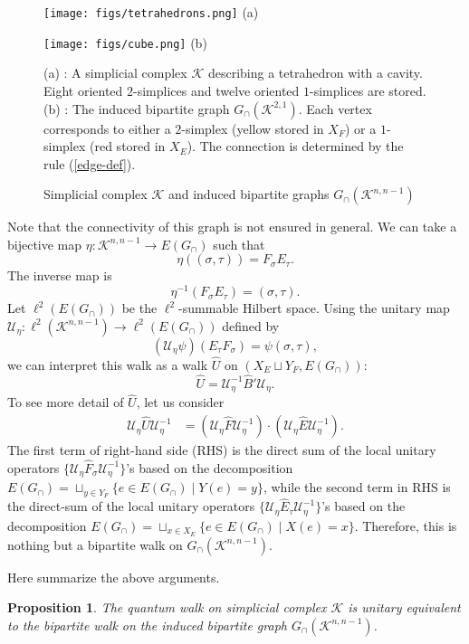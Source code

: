 \documentclass[a4paper,12pt]{article}
\newtheorem{proposition}[definition]{Proposition}
\numberwithin{equation}{section}
\begin{document}
\begin{figure}[htbp]\em
\begin{minipage}{0.5\hsize}
\centering
\texttt{[image: figs/tetrahedrons.png]}
(a)
\end{minipage}
\begin{minipage}{0.5\hsize}
\centering
\texttt{[image: figs/cube.png]}
(b)
\end{minipage}
\caption{Simplicial complex $\mathcal{K}$ and induced bipartite graphs $G_\cap (\mathcal{K}^{n,n-1})$}
\label{fig-bipartite}
(a) : A simplicial complex $\mathcal{K}$ describing a tetrahedron with a cavity. 
Eight oriented $2$-simplices and twelve oriented $1$-simplices are stored.
(b) : The induced bipartite graph $G_\cap (\mathcal{K}^{2,1})$.
Each vertex corresponds to either a $2$-simplex (yellow stored in $X_F$) or a $1$-simplex (red stored in $X_E$).
The connection is determined by the rule (\ref{edge-def}).
\end{figure}


Note that the connectivity of this graph is not ensured in general.
We can take a bijective map $\eta:\mathcal{K}^{n,n-1}\to E(G_\cap)$ such that
	\[ \eta((\sigma,\tau))=F_\sigma E_\tau.  \]
The inverse map is 
	\[ \eta^{-1}(F_{\sigma}E_{\tau})=(\sigma,\tau). \]
Let $\ell^2(E(G_\cap))$ be the $\ell^2$-summable Hilbert space. 
Using the unitary map $\mathcal{U}_\eta: \ell^2(\mathcal{K}^{n,n-1})\to \ell^2(E(G_\cap))$ defined by
\begin{equation*}
(\mathcal{U}_\eta\psi)(E_{\tau}F_{\sigma})= \psi(\sigma,\tau),
\end{equation*}
we can interpret this walk as a walk $\hat{U}$ on $(X_E\sqcup Y_F, E(G_\cap))$: 
\begin{equation*}
\hat{U}=\mathcal{U}_{\eta}^{-1} \hat{B}' \mathcal{U}_\eta.
\end{equation*}
To see more detail of $\hat{U}$, let us consider   
	\begin{align*} 
        \mathcal{U}_\eta \hat{U} \mathcal{U}_\eta^{-1}
        	&=  (\mathcal{U}_\eta \hat{F} \mathcal{U}_\eta^{-1})\cdot (\mathcal{U}_\eta \hat{E} \mathcal{U}_\eta^{-1}).
        \end{align*}
The first term of right-hand side (RHS) is the direct sum of the local unitary operators $\{\mathcal{U}_\eta\hat{F}_\sigma\mathcal{U}_{\eta}^{-1}\}$'s based on the decomposition $E(G_\cap) = \sqcup_{y\in Y_F}\{e\in E(G_\cap) \;|\; Y(e)=y\}$, while the second term in RHS 
is the direct-sum of the local unitary operators $\{\mathcal{U}_\eta\hat{E}_\tau\mathcal{U}_{\eta}^{-1}\}$'s  
based on the decomposition $E(G_\cap) = \sqcup_{x\in X_E}\{e\in E(G_\cap) \;|\; X(e)=x\}$. 
Therefore, this is nothing but a bipartite walk on $G_\cap(\mathcal{K}^{n,n-1})$. 
\par
Here summarize the above arguments. 
%
\begin{proposition}
\label{graphinterpretation}
The quantum walk on simplicial complex $\mathcal{K}$ is unitary equivalent to the bipartite walk on the induced bipartite graph $G_\cap(\mathcal{K}^{n,n-1})$. 
\end{proposition}
\end{document}
